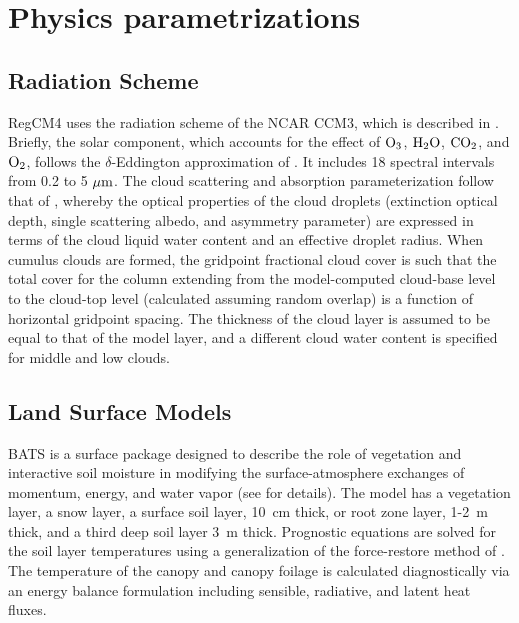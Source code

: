 \section{Physics parametrizations} \label{sec:physics}

\subsection{Radiation Scheme}

\noindent RegCM4 uses the radiation scheme of
the NCAR CCM3, which is described in \cite{Kiehl_96}.  Briefly, the solar
component, which accounts for the effect of ${\rm O_3}$, ${\rm H_2O}$, ${\rm
CO_2}$, and ${\rm O_2}$, follows the $\delta$-Eddington approximation of
\cite{Kiehl_96}.  It includes 18 spectral intervals from 0.2 to 5 $\mu {\rm m}$.
The cloud scattering and absorption parameterization follow that of
\cite{Slingo_89}, whereby the optical properties of the cloud droplets
(extinction optical depth, single scattering albedo, and asymmetry parameter)
are expressed in terms of the cloud liquid water content and an effective
droplet radius.  When cumulus clouds are formed, the gridpoint fractional cloud
cover is such that the total cover for the column extending from the
model-computed cloud-base level to the cloud-top level (calculated assuming
random overlap) is a function of horizontal gridpoint spacing.  The thickness of
the cloud layer is assumed to be equal to that of the model layer, and a
different cloud water content is specified for middle and low clouds.

\subsection{Land Surface Models}

 BATS is a surface package designed to describe
the role of vegetation and interactive soil moisture in modifying the
surface-atmosphere exchanges of momentum, energy, and water vapor (see
\cite{Dickinson_93} for details).  The model has a vegetation layer, a snow
layer, a surface soil layer, 10~cm thick, or root zone layer, 1-2~m thick, and a
third deep soil layer 3~m thick.  Prognostic equations are solved for the soil
layer temperatures using a generalization of the force-restore method of
\cite{Deardoff_78}.  The temperature of the canopy and canopy foilage is
calculated diagnostically via an energy balance formulation including sensible,
radiative, and latent heat fluxes.

